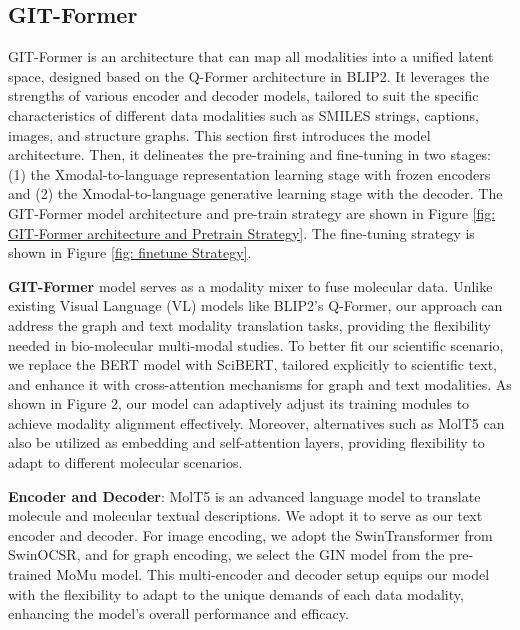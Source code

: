 \documentclass{article}
\begin{document}
\subsection{GIT-Former}
GIT-Former is an architecture that can map all modalities into a unified latent space, designed based on the Q-Former architecture in BLIP2. It leverages the strengths of various encoder and decoder models, tailored to suit the specific characteristics of different data modalities such as SMILES strings, captions, images, and structure graphs. This section first introduces the model architecture. Then, it delineates the pre-training and fine-tuning in two stages: (1) the Xmodal-to-language representation learning stage with frozen encoders and (2) the Xmodal-to-language generative learning stage with the decoder. The GIT-Former model architecture and pre-train strategy are shown in Figure \ref{fig: GIT-Former architecture and Pretrain Strategy}. The fine-tuning strategy is shown in Figure \ref{fig: finetune Strategy}.

\textbf{GIT-Former} model serves as a modality mixer to 
 fuse molecular data. Unlike existing Visual Language (VL) models like BLIP2's Q-Former, our approach can address the graph and text modality translation tasks, providing the flexibility needed in bio-molecular multi-modal studies. To better fit our scientific scenario, we replace the BERT\cite{devlin2018bert} model with SciBERT\cite{beltagy2019scibert}, tailored explicitly to scientific text, and enhance it with cross-attention mechanisms for graph and text modalities. As shown in Figure 2, our model can adaptively adjust its training modules to achieve modality alignment effectively. Moreover, alternatives such as MolT5 can also be utilized as embedding and self-attention layers, providing flexibility to adapt to different molecular scenarios.

\textbf{Encoder and Decoder}: MolT5 is an advanced language model to translate molecule and molecular textual descriptions. We adopt it to serve as our text encoder and decoder. For image encoding, we adopt the SwinTransformer\cite{liu2021swin} from SwinOCSR, and for graph encoding, we select the GIN model from the pre-trained MoMu model. This multi-encoder and decoder setup equips our model with the flexibility to adapt to the unique demands of each data modality, enhancing the model's overall performance and efficacy.
\end{document}
